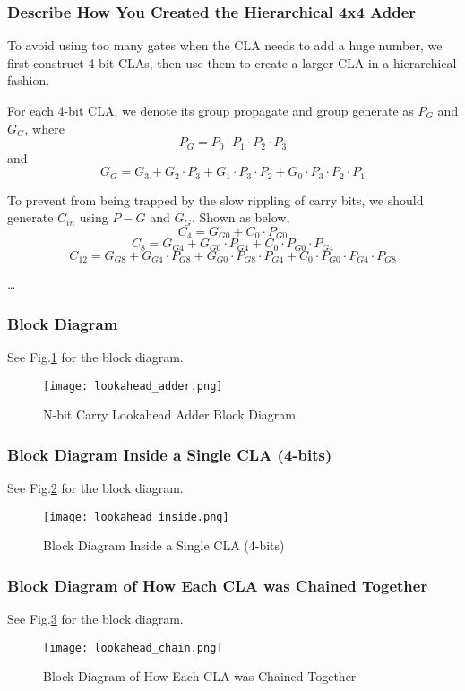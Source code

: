\documentclass[11pt]{article}
\begin{document}
\subsubsection{Describe How You Created the Hierarchical 4x4 Adder}
To avoid using too many gates when the CLA needs to add a huge number, we first construct 4-bit CLAs, then use them to create a larger CLA in a hierarchical fashion.

For each 4-bit CLA, we denote its group propagate and group generate as $P_G$ and $G_G$, where $$P_G=P_0\cdot P_1\cdot P_2\cdot P_3$$ and $$G_G=G_3+G_2\cdot P_3+G_1\cdot P_3\cdot P_2+G_0\cdot P_3\cdot P_2\cdot P_1$$

To prevent from being trapped by the slow rippling of carry bits, we should generate $C_{in}$ using $P-G$ and $G_G$. Shown as below, $$C_4=G_{G0}+C_0\cdot P_{G0}$$
$$C_8=G_{G4}+G_{G0}\cdot P_{G4}+C_0\cdot P_{G0}\cdot P_{G4}$$
$$C_{12}=G_{G8}+G_{G4}\cdot P_{G8}+G_{G0}\cdot P_{G8}\cdot P_{G4}+C_0\cdot P_{G0}\cdot P_{G4}\cdot P_{G8}$$

\centerline{\dots}

\subsubsection{Block Diagram}
See Fig.\ref{lookahead} for the block diagram.
\begin{figure}[h]
    \centering
    \texttt{[image: lookahead\_adder.png]}
    \caption{N-bit Carry Lookahead Adder Block Diagram}
    \label{lookahead}
\end{figure}
\subsubsection{Block Diagram Inside a Single CLA (4-bits)}
See Fig.\ref{lookahead_inside} for the block diagram.
\begin{figure}[h]
    \centering
    \texttt{[image: lookahead\_inside.png]}
    \caption{Block Diagram Inside a Single CLA (4-bits)}
    \label{lookahead_inside}
\end{figure}
\subsubsection{Block Diagram of How Each CLA was Chained Together}
See Fig.\ref{lookahead_chain} for the block diagram.
\begin{figure}[h]
    \centering
    \texttt{[image: lookahead\_chain.png]}
    \caption{Block Diagram of How Each CLA was Chained Together}
    \label{lookahead_chain}
\end{figure}
\end{document}
